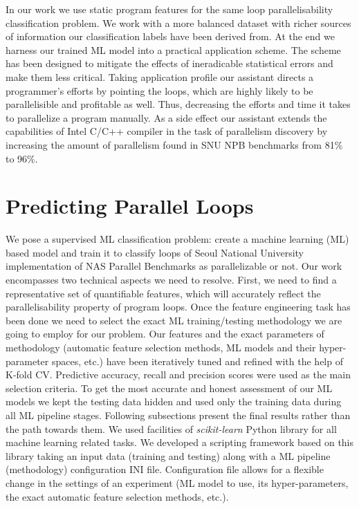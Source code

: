 \documentclass{acaces}
\begin{document}
\quad In our work we use static program features for the same loop parallelisability classification problem. We work with a more balanced dataset with richer sources of information our classification labels have been derived from. At the end we harness our trained ML model into a practical application scheme. The scheme has been designed to mitigate the effects of ineradicable statistical errors and make them less critical. Taking application profile our assistant directs a programmer's efforts by pointing the loops, which are highly likely to be parallelisible and profitable as well. Thus, decreasing the efforts and time it takes to parallelize a program manually. As a side effect our assistant extends the capabilities of Intel C/C++ compiler in the task of parallelism discovery by increasing the amount of parallelism found in SNU NPB benchmarks from 81\% to 96\%.

\section{Predicting Parallel Loops}
\label{predicting_parallel_loops}
\quad We pose a supervised ML classification problem: create a machine learning (ML) based model and train it to classify loops of Seoul National University implementation \cite{snu-npb-benchmarks} of NAS Parallel Benchmarks \cite{nasa-parallel-benchmarks} as parallelizable or not.\newline\null
\quad Our work encompasses two technical aspects we need to resolve. First, we need to find a representative set of quantifiable features, which will accurately reflect the parallelisability property of program loops. Once the feature engineering task has been done we need to select the exact ML training/testing methodology we are going to employ for our problem.\newline\null  
\quad Our features and the exact parameters of methodology (automatic feature selection methods, ML models and their hyper-parameter spaces, etc.) have been iteratively tuned and refined with the help of K-fold CV. Predictive accuracy, recall and precision scores were used as the main selection criteria. To get the most accurate and honest assessment of our ML models we kept the testing data hidden and used only the training data during all ML pipeline stages. Following subsections present the final results rather than the path towards them.
\quad We used facilities of \textit{scikit-learn} \cite{scikit-learn} Python library for all machine learning related tasks. We developed a scripting framework based on this library taking an input data (training and testing) along with a ML pipeline (methodology) configuration INI file. Configuration file allows for a flexible change in the settings of an experiment (ML model to use, its hyper-parameters, the exact automatic feature selection methods, etc.).\newline\null
\end{document}
